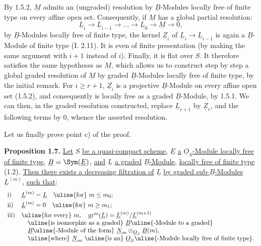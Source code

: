 By 1.5.2, \(\underline{M}\) admits an (ungraded) resolution by \(\underline{B}\)-Modules locally free of finite type on every affine open set. Consequently, if
%
\(\underline{M}\) has a global partial resolution:
\[
  \underline{L}_i\longrightarrow \underline{L}_{i-1}\longrightarrow\ldots\longrightarrow \underline{L}_0\longrightarrow \underline{M}\longrightarrow 0,
\]
by \(\underline{B}\)-Modules locally free of finite type, the kernel \(\underline{Z}_i\) of \(\underline{L}_i\to \underline{L}_{i-1}\) is again a \(\underline{B}\)-Module of finite type (I. 2.11). It is even of finite presentation (by making the same argument with \(i+1\) instead of \(i\)). Finally, it is flat over \(S\). It therefore satisfies the same hypotheses as \(\underline{M}\), which allows us to construct step by step a global graded resolution of \(\underline{M}\) by graded \(\underline{B}\)-Modules locally free of finite type, by the initial remark. For \(i\geq r+1\), \(\underline{Z}_i\) is a projective \(\underline{B}\)-Module on every affine open set (1.5.2), and consequently is locally free as a graded \(\underline{B}\)-Module, by 1.5.1. We can then, in the graded resolution constructed, replace \(\underline{L}_{r+1}\) by \(\underline{Z}_r\), and the following terms by \(0\), whence the asserted resolution.

Let us finally prove point c) of the proof.

\textbf{Proposition 1.7.} \uline{Let} \(S\) \uline{be a quasi-compact scheme}, \(\underline{E}\) \uline{a} \(\underline{O}_S\)\uline{-Module locally free of finite type}, \(\underline{B}=\Sym(\underline{E})\), \uline{and} \(\underline{L}\) \uline{a graded} \(\underline{B}\)\uline{-Module}, \uline{locally free of finite type} (1.2). \uline{Then there exists a decreasing filtration of} \(\underline{L}\) \uline{by graded sub-}\(\underline{B}\)\uline{-Modules} \(\underline{L}^{(m)}\), \uline{such that}:
\[
\begin{array}{ll}
\text{i)}& \underline{L}^{(m)}=\underline{L}\quad\text{\uline{for} }m\leq m_0;\\[1mm]
\text{ii)}& \underline{L}^{(m)}=0\quad\text{\uline{for} }m\geq m_1;\\[1mm]
\text{iii)}& \text{\uline{for every} }m,\quad \operatorname{gr}^m(\underline{L})=\underline{L}^{(m)}/\underline{L}^{(m+1)}\\
&\quad \text{\uline{is isomorphic as a graded} }\underline{B}\text{\uline{-Module to a graded}}\\
&\quad \underline{B}\text{\uline{-Module of the form} }\underline{N}_m\otimes_{\underline{O}_S}\underline{B}(m),\\
&\quad \text{\uline{where} }\underline{N}_m\text{ \uline{is an} }\underline{O}_S\text{\uline{-Module locally free of finite type}.}
\end{array}
\]


